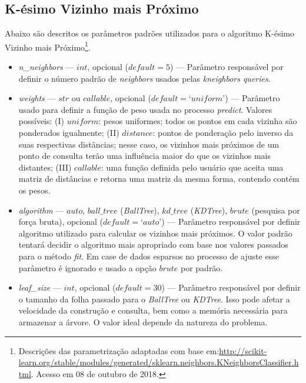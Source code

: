 \documentclass[
	12pt,				%
	oneside,			%
	a4paper,			%
	english,			%
	brazil				%
	]{abntex2ppgsi}
\begin{document}
{{\begin{apendicesenv}
\section{K-ésimo Vizinho mais Próximo}

Abaixo são descritos os parâmetros padrões utilizados para o algoritmo K-ésimo Vizinho mais Próximo\footnote{Descrições das parametrização adaptadas com base em:\url{http://scikit-learn.org/stable/modules/generated/sklearn.neighbors.KNeighborsClassifier.html}. Acesso em 08 de outubro de 2018.}.

\begin{itemize}

\item \textit{n\_neighbors} --- $int$, opcional ($default = 5$) --- Parâmetro responsável por definir o número padrão de \textit{neighbors} usados pelas \textit{kneighbors queries}.

\item \textit{weights} --- $str$ ou $callable$, opcional ($default = ‘uniform’$) --- Parâmetro usado para definir a função de peso usada no processo \textit{predict}. Valores possíveis: (I) $uniform$: pesos uniformes; todos os pontos em cada vizinha são ponderados igualmente; (II) $distance$: pontos de ponderação pelo inverso da suas respectivas distâncias; nesse caso, os vizinhos mais próximos de um ponto de consulta terão uma influência maior do que os vizinhos mais distantes; (III) $callable$: uma função definida pelo usuário que aceita uma matriz de distâncias e retorna uma matriz da mesma forma, contendo contém os pesos.

\item \textit{algorithm} --- $auto$, $ball\_tree$ (\textit{BallTree}), $kd\_tree$ (\textit{KDTree}), $brute$ (pesquisa por força bruta), opcional ($default = ‘auto’$) --- Parâmetro responsável por definir algoritmo utilizado para calcular os vizinhos mais próximos. O valor padrão tentará decidir o algoritmo mais apropriado com base nos valores passados para o método \textit{fit}. Em case de dados esparsos no processo de ajuste esse parâmetro é ignorado e usado a opção $brute$ por padrão.

\item \textit{leaf\_size} --- $int$, opcional ($default = 30$) --- Parâmetro responsável por definir o tamanho da folha passado para o \textit{BallTree} ou \textit{KDTree}. Isso pode afetar a velocidade da construção e consulta, bem como a memória necessária para armazenar a árvore. O valor ideal depende da natureza do problema.


\end{itemize}
\end{apendicesenv}}}
\end{document}
